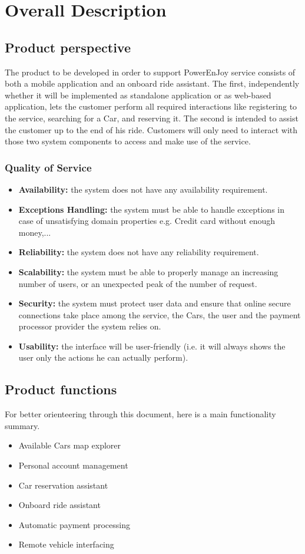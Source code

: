 \section{Overall Description}
\subsection{Product perspective}
The product to be developed in order to support PowerEnJoy service consists of both a mobile application and an onboard ride assistant. The first, independently whether it will be implemented as standalone application or as web-based application, lets the customer perform all required interactions like registering to the service, searching for a Car, and reserving it. The second is intended to assist the customer up to the end of his ride. Customers will only need to interact with those two system components to access and make use of the service.
\subsubsection{Quality of Service}
\begin{itemize}
    \item \textbf{Availability:} the system does not have any availability requirement.
    \item \textbf{Exceptions Handling:} the system must be able to handle exceptions in case of unsatisfying domain properties e.g. Credit card without enough money,...
    \item \textbf{Reliability:} the system does not have any reliability requirement.
    \item \textbf{Scalability:} the system must be able to properly manage an increasing number of users, or an unexpected peak of the number of request.
    \item \textbf{Security:} the system must protect user data and ensure that online secure connections take place among the service, the Cars, the user and the payment processor provider the system relies on.
    \item \textbf{Usability:} the interface will be user-friendly (i.e. it will always shows the user only the actions he can actually perform).
\end{itemize}

\subsection{Product functions}
For better orienteering through this document, here is a main functionality summary.
\begin{itemize}
\item Available Cars map explorer
\item Personal account management
\item Car reservation assistant
\item Onboard ride assistant
\item Automatic payment processing
\item Remote vehicle interfacing
\end{itemize}

